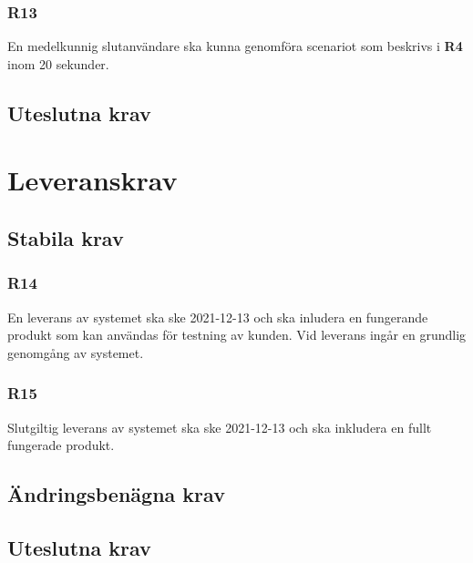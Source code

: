 \documentclass{article}
\begin{document}
    \subsubsection*{R13}
    En medelkunnig slutanvändare ska kunna genomföra scenariot som beskrivs i \textbf{R4} inom 20 sekunder.
    
    \subsection*{Uteslutna krav}
    
    \section{Leveranskrav}
    
    \subsection*{Stabila krav}
     \subsubsection*{R14}
     En leverans av systemet ska ske 2021-12-13 och ska inludera en fungerande produkt som kan användas för testning av kunden. Vid leverans ingår en grundlig genomgång av systemet.
     
     \subsubsection*{R15}
     Slutgiltig leverans av systemet ska ske 2021-12-13 och ska inkludera en fullt fungerade produkt.
     
     
    \subsection*{Ändringsbenägna krav}
    
    \subsection*{Uteslutna krav}
    
    
   

\end{document}
